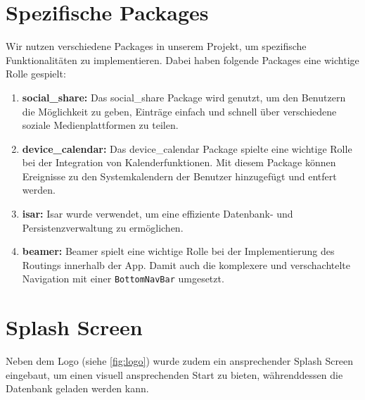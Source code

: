 \section{Spezifische Packages}
Wir nutzen verschiedene Packages in unserem Projekt, um spezifische Funktionalitäten zu implementieren. 
Dabei haben folgende Packages eine wichtige Rolle gespielt:

\begin{enumerate}
\item \textbf{social\_share:} Das social\_share Package wird genutzt, um den Benutzern die Möglichkeit zu geben, Einträge einfach und schnell über verschiedene soziale Medienplattformen zu teilen.

\item \textbf{device\_calendar:} Das device\_calendar Package spielte eine wichtige Rolle bei der Integration von Kalenderfunktionen. Mit diesem Package können Ereignisse zu den Systemkalendern der Benutzer hinzugefügt und entfert werden.

\item \textbf{isar:} Isar wurde verwendet, um eine effiziente Datenbank- und Persistenzverwaltung zu ermöglichen.

\item \textbf{beamer:} Beamer spielt eine wichtige Rolle bei der Implementierung des Routings innerhalb der App. Damit auch die komplexere und verschachtelte Navigation mit einer \verb|BottomNavBar| umgesetzt.

\end{enumerate}

\section{Splash Screen}
Neben dem Logo (siehe \ref{fig:logo}) wurde zudem ein ansprechender Splash Screen eingebaut, 
um einen visuell ansprechenden Start zu bieten, währenddessen die Datenbank geladen werden kann.
